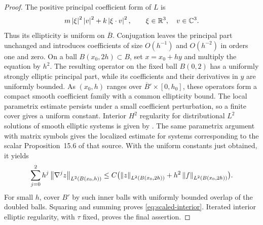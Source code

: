 \begin{proof}
The positive principal coefficient form of $L$ is
\[
 m\left\lvert \xi\right\rvert^2\left\lvert v\right\rvert^2+k\left\lvert \xi\cdot v\right\rvert^2,
 \qquad \xi\in\mathbb R^3,\quad v\in\mathbb C^3.
\]
Thus its ellipticity is uniform on $\overline B$. Conjugation leaves
the principal part unchanged and introduces coefficients of size
$O(h^{-1})$ and $O(h^{-2})$ in orders one and zero. On a ball
$B(x_0,2h)\subset B$, set $x=x_0+hy$ and multiply the equation by
$h^2$. The resulting operator on the fixed ball $B(0,2)$ has a
uniformly strongly elliptic principal part, while its coefficients
and their derivatives in $y$ are uniformly bounded. As
$(x_0,h)$ ranges over $\overline B'\times[0,h_0]$, these operators
form a compact smooth coefficient family with a common ellipticity
bound. The local parametrix estimate persists under a small
coefficient perturbation, so a finite cover gives a uniform constant.
Interior $H^2$ regularity for distributional $L^2$ solutions of smooth
elliptic systems is given by
\cite[Theorem~15.1 and Remark~15.2]{Dyatlov2026}. The same parametrix
argument with matrix symbols gives the localized estimate for systems
corresponding to the scalar Proposition~15.6 of that source. With the
uniform constants just obtained, it yields
\[
 \sum_{j=0}^2 h^j\left\lVert \nabla^jz\right\rVert_{L^2(B(x_0,h))}
 \le C\bigl(\left\lVert z\right\rVert_{L^2(B(x_0,2h))}
                      +h^2\left\lVert f\right\rVert_{L^2(B(x_0,2h))}\bigr).
\]
For small $h$, cover $B'$ by such inner balls with uniformly bounded
overlap of the doubled balls. Squaring and summing proves
\eqref{eq:scaled-interior}. Iterated interior elliptic regularity,
with $\tau$ fixed, proves the final assertion.
\end{proof}
